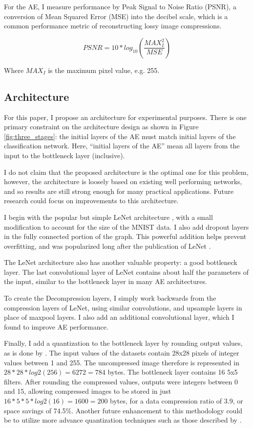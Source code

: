 \documentclass[twoside,11pt]{article}
\begin{document}
For the AE, I measure performance by Peak Signal to Noise Ratio (PSNR), 
a conversion of Mean Squared Error (MSE) into the decibel scale, which is a common
performance metric of reconstructing lossy image compressions.

\begin{equation}
PSNR = 10*log_{10}\left(\frac{MAX^2_I}{MSE}\right)
\end{equation}

Where $MAX_I$ is the maximum pixel value, e.g. 255.


\subsection{Architecture}

For this paper, I propose an architecture for experimental purposes.
There is one primary constraint on the architecture design as shown in Figure \ref{fig:three_stages}:
the initial layers of the AE must match initial layers of the classification network.
Here, ``initial layers of the AE'' mean all layers from the input to the bottleneck layer (inclusive).

I do not claim that the proposed architecture is the optimal one for this problem,
however, the architecture is loosely based on existing well performing networks, and so 
results are still strong enough for many practical applications.
Future research could focus on improvements to this architecture.

I begin with the popular but simple LeNet architecture \citep{lecun1998gradient}, 
with a small modification to account for the size of the MNIST data.
I also add dropout layers in the fully connected portion of the graph. 
This powerful addition helps prevent overfitting, and was popularized long
after the publication of LeNet \citep{srivastava2014dropout}.

The LeNet architecture also has another valuable property: a good bottleneck layer.
The last convolutional layer of LeNet contains about half the parameters of the input,
similar to the bottleneck layer in many AE architectures. 

To create the Decompression layers, I simply work backwards from the compression layers of LeNet,
using similar convolutions, and upsample layers in place of maxpool layers.
I also add an additional convolutional layer, which I found to improve AE performance.

Finally, I add a quantization to the bottleneck layer by rounding output values, as is done
by \citet{theis2017}.
The input values of the datasets contain 28x28 pixels of integer values between 1 and 255.
The uncompressed image therefore is represented in $28*28*log2(256) = 6272 = 784$ bytes.
The bottleneck layer contains 16 5x5 filters. 
After rounding the compressed values, outputs were integers between 0 and 15,
allowing compressed images to be stored in just $16*5*5*log2(16) = 1600 = 200$ bytes,
for a data compression ratio of 3.9, or space savings of 74.5\%. 
Another future enhancement to this methodology could be to utilize more advance quantization techniques
such as those described by \citet{hubara2018}.
\end{document}
